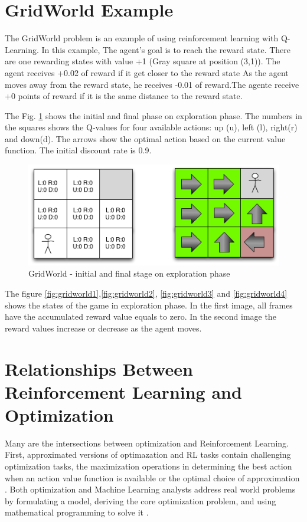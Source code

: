 \section{GridWorld Example}

The GridWorld problem is an example of using reinforcement learning with Q-Learning. In this example,  The agent's goal is to reach the reward state.  There are one rewarding states with value +1 (Gray square at position (3,1)). The agent receives +0.02 of reward if it get closer to the reward state  As the agent moves away from the reward state, he receives -0.01 of reward.The agente receive +0 points of reward if it is the same distance to the reward state.

The Fig. \ref{fig:gridworld} shows the initial and final phase on exploration phase. The numbers in the squares shows the Q-values  for four available actions: up (u), left (l), right(r) and down(d). The arrows show the optimal action based on the current value function. The initial discount rate is 0.9. 

\begin{figure}[h!]
\centering
\includegraphics[width=1\textwidth]{./images/mdpgridworld.png}
\caption{GridWorld - initial and final stage on exploration phase}
\label{fig:gridworld}
\end{figure}

The figure  \ref{fig:gridworld1},\ref{fig:gridworld2}, \ref{fig:gridworld3} and \ref{fig:gridworld4}   shows the states of the game in exploration phase. In the first image, all frames have the accumulated reward value equals to zero. In the second image the reward values increase or decrease as the agent moves.

\section{Relationships Between Reinforcement Learning and Optimization}

Many are the intersections between optimization and Reinforcement Learning. First, approximated versions of optimazation and RL tasks contain challenging optimization tasks,  the maximization operations in determining the best action when an action value function is available or the optimal choice of approximation \cite{Battiti2009}. Both optimization and Machine Learning analysts address real world problems by formulating a model, deriving the core optimization problem, and using mathematical programming to solve it \cite{Bennett2006} \cite{Boyan2000}. 

